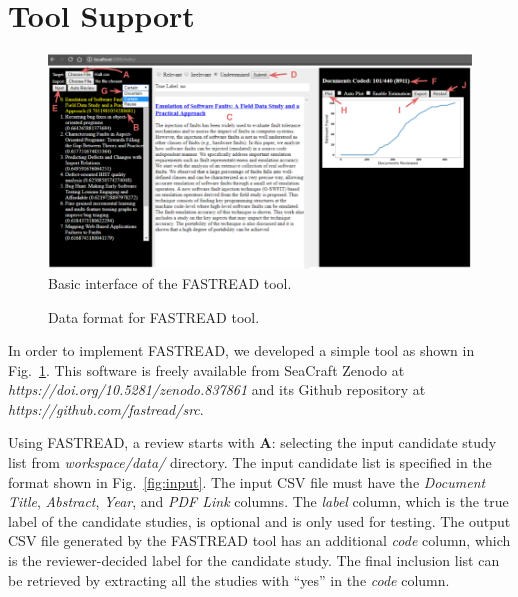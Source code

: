 \documentclass{svjour3}
\theoremstyle{break}
\begin{document}
\section{Tool Support}
\label{sect: tool}

\begin{figure}[!tbhp]
    \centering
    \includegraphics[width=\linewidth]{FASTREAD.png}
    \caption{Basic interface of the FASTREAD tool.}
    \label{fig:FASTREAD}
\end{figure}


\begin{figure}[!tbhp]
    \centering
    
    \caption{Data format for FASTREAD tool.}
    \label{fig:csv}
\end{figure}

In order to implement FASTREAD, we developed a simple tool as shown in Fig.~\ref{fig:FASTREAD}. This software is freely available from SeaCraft Zenodo at \textit{https://doi.org/10.5281/zenodo.837861} and its Github repository at \textit{https://github.com/fastread/src}. 


Using FASTREAD, a review starts with \textbf{A}: selecting the input candidate study list from \textit{workspace/data/} directory. The input candidate list is specified in the format shown in Fig.~\ref{fig:input}. The input CSV file must have the \textit{Document Title}, \textit{Abstract}, \textit{Year}, and \textit{PDF Link} columns. The \textit{label} column, which is the true label of the candidate studies, is optional and is only used for testing. The output CSV file generated by the FASTREAD tool has an additional \textit{code} column, which is the reviewer-decided label for the candidate study. The final inclusion list can be retrieved by extracting all the studies with ``yes'' in the \textit{code} column.
\end{document}
